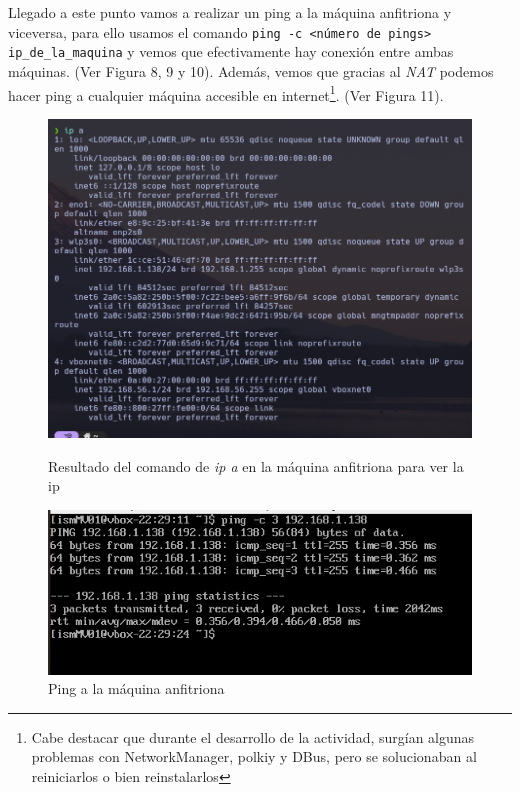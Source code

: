 Llegado a este punto vamos a realizar un ping a la máquina anfitriona y viceversa, para ello usamos el comando \texttt{ping -c <número de pings> ip\_de\_la\_maquina} y vemos que efectivamente hay conexión entre ambas máquinas. (Ver Figura 8, 9 y 10). Además, vemos que gracias al \textit{NAT} podemos hacer ping a cualquier máquina accesible en internet\footnote{Cabe destacar que durante el desarrollo de la actividad, surgían algunas problemas con NetworkManager, polkiy y DBus, pero se solucionaban al reiniciarlos o bien reinstalarlos}. (Ver Figura 11).

\begin{figure}[htbp]
    \centering
    \begin{minipage}[b]{0.45\textwidth}
        \centering
        \includegraphics[width=\textwidth]{images/Bloque1/ip_a_host.png}
        \caption{Resultado del comando de \textit{ip a } en la máquina anfitriona para ver la ip}
    \end{minipage}
    \hfill
    \begin{minipage}[b]{0.45\textwidth}
        \centering
        \includegraphics[width=\textwidth]{images/Bloque1/ping_a_anfitriona.png}
        \caption{Ping a la máquina anfitriona}
    \end{minipage}
\end{figure}


